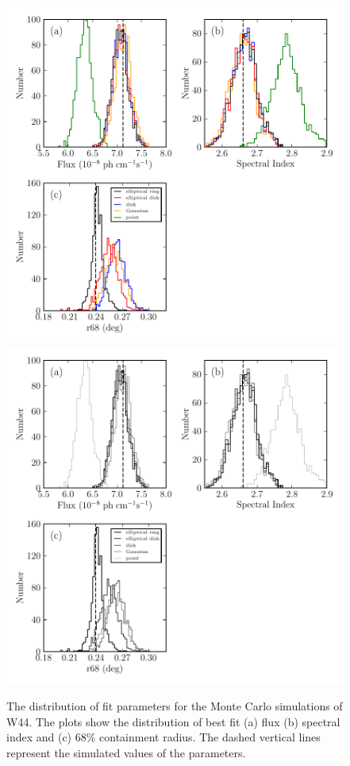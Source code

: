 \begin{figure}[htbp]
    \ifcolorfigure
    \includegraphics{chapters/extended_analysis/figures/mc_plots/bias_w44sim_color.pdf}
    \else
    \includegraphics{chapters/extended_analysis/figures/mc_plots/bias_w44sim_bw.pdf}
    \fi
    \caption{
    The distribution of fit parameters
    for the Monte Carlo simulations of W44.
    The plots show the distribution of 
    best fit (a) flux (b) spectral index and (c) 68\% containment
    radius. The dashed vertical lines represent
    the simulated values of the parameters.
    }
\end{figure}



